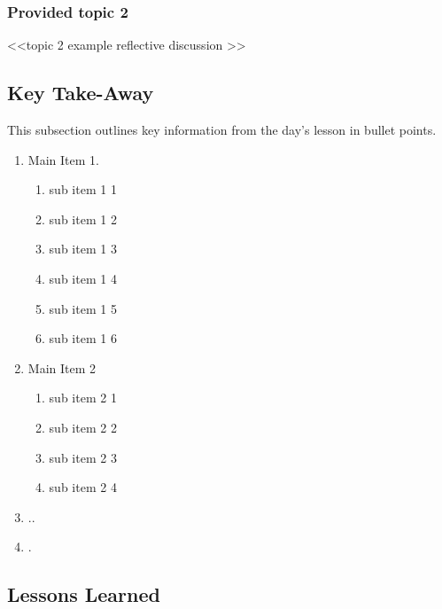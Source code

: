 \subsubsection{Provided topic 2}

<<topic 2 example reflective discussion >>






\subsection{Key Take-Away}

This subsection outlines key information from the day's lesson in bullet points.

\begin{enumerate}
    \item Main Item 1.
    \begin{enumerate}
        \item sub item 1 1
        \item sub item 1 2
        \item sub item 1 3
        \item sub item 1 4
        \item sub item 1 5
        \item sub item 1 6
    \end{enumerate}
    \item Main Item 2
    \begin{enumerate}
        \item sub item 2 1
        \item sub item 2 2
        \item sub item 2 3
        \item sub item 2 4
    \end{enumerate}
    \item ..
    \item .
\end{enumerate}


\subsection{Lessons Learned}

